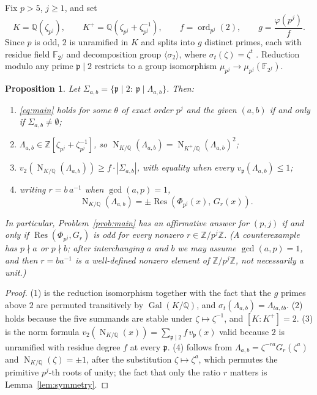 \documentclass[a4paper]{article}
\newtheorem{proposition}[theorem]{Proposition}
\newcommand{\F}{\mathbb{F}}
\newcommand{\Z}{\mathbb{Z}}
\newcommand{\Q}{\mathbb{Q}}
\newcommand{\ord}[2][]{\operatorname{ord}_{#1}\!\left(#2\right)}
\newcommand{\abs}[1]{\left|#1\right|}
\DeclareMathOperator{\Res}{Res}
\DeclareMathOperator{\Nm}{N}
\DeclareMathOperator{\Gal}{Gal}
\begin{document}
Fix $p>5$, $j\geq1$, and set
\[
	K=\Q(\zeta_{p^j}),\qquad
	K^{+}=\Q(\zeta_{p^j}+\zeta_{p^j}^{-1}),\qquad
	f=\ord[p^j]{2},\qquad
	g=\frac{\varphi(p^j)}{f}.
\]
Since $p$ is odd, $2$ is unramified in $K$ and splits into $g$ distinct
primes, each with residue field $\F_{2^{f}}$ and decomposition group
$\langle\sigma_2\rangle$, where $\sigma_t(\zeta)=\zeta^{t}$
\cite[Ch.~2]{Washington1997}.
Reduction modulo any prime $\mathfrak{p}\mid2$ restricts to a group
isomorphism $\mu_{p^j}\to\mu_{p^j}(\F_{2^{f}})$.

\begin{proposition}\label{prop:dictionary}
	Let $\Sigma_{a,b}=\{\mathfrak{p}\mid2:\ \mathfrak{p}\mid\Lambda_{a,b}\}$.
	Then:
	\begin{enumerate}
		\item \eqref{eq:main} holds for some $\theta$ of exact order $p^j$
		      and the given $(a,b)$ if and only if
		      $\Sigma_{a,b}\ne\emptyset$;
		\item $\Lambda_{a,b}\in\Z[\zeta_{p^j}+\zeta_{p^j}^{-1}]$, so
		      $\Nm_{K/\Q}(\Lambda_{a,b})=\Nm_{K^{+}/\Q}(\Lambda_{a,b})^{2}$;
		\item $v_2\!\left(\Nm_{K/\Q}(\Lambda_{a,b})\right)\geq f\cdot\abs{\Sigma_{a,b}}$,
		      with equality when every $v_{\mathfrak{p}}(\Lambda_{a,b})\leq1$;
		\item writing $r=b\,a^{-1}$ when $\gcd(a,p)=1$,
		      \[
			      \Nm_{K/\Q}(\Lambda_{a,b})=\pm\Res\!\left(\Phi_{p^j}(x),\,G_r(x)\right).
		      \]
	\end{enumerate}
	In particular, Problem~\ref{prob:main} has an affirmative answer for
	$(p,j)$ if and only if $\Res(\Phi_{p^j},G_r)$ is odd for every
	nonzero $r\in\Z/p^j\Z$.
	(A counterexample has $p\nmid a$ or $p\nmid b$; after interchanging
	$a$ and $b$ we may assume $\gcd(a,p)=1$, and then $r=ba^{-1}$ is a
	well-defined nonzero element of $\Z/p^j\Z$, not necessarily a unit.)
\end{proposition}

\begin{proof}
	(1) is the reduction isomorphism together with the fact that the $g$
	primes above $2$ are permuted transitively by $\Gal(K/\Q)$, and
	$\sigma_t(\Lambda_{a,b})=\Lambda_{ta,tb}$.
	(2) holds because the five summands are stable under
	$\zeta\mapsto\zeta^{-1}$, and $[K:K^{+}]=2$.
	(3) is the norm formula
	$v_2(\Nm_{K/\Q}(x))=\sum_{\mathfrak{p}\mid2}f\,v_{\mathfrak{p}}(x)$
	valid because $2$ is unramified with residue degree $f$ at every
	$\mathfrak{p}$.
	(4) follows from $\Lambda_{a,b}=\zeta^{-ra}G_r(\zeta^{a})$ and
	$\Nm_{K/\Q}(\zeta)=\pm1$, after the substitution
	$\zeta\mapsto\zeta^{a}$, which permutes the primitive $p^j$-th roots
	of unity; the fact that only the ratio $r$ matters is
	Lemma~\ref{lem:symmetry}.
\end{proof}
\end{document}
